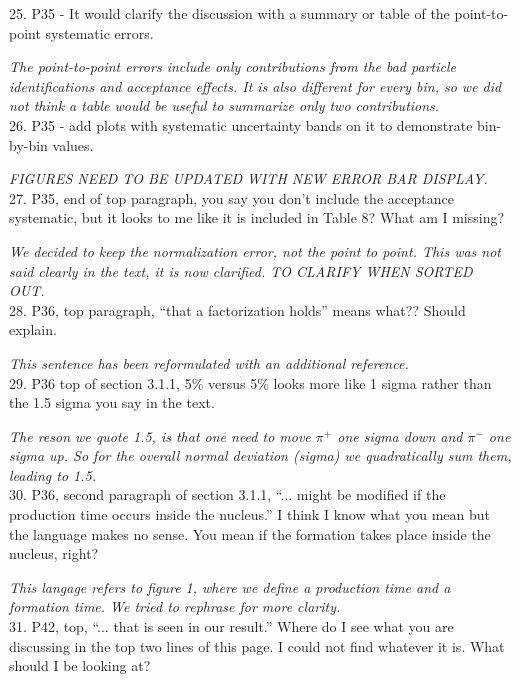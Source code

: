 \documentclass[12pt]{article}
\begin{document}
25.
P35 - It would clarify the discussion with a summary or table of the point-to-point systematic 
errors.

{\it The point-to-point errors include only contributions from the bad particle 
identifications and acceptance effects. It is also different for every bin, so
we did not think a table would be useful to summarize only two contributions.} \\

26.
P35 -
 add plots with systematic uncertainty bands on it to demonstrate bin-by-bin values.

{\it FIGURES NEED TO BE UPDATED WITH NEW ERROR BAR DISPLAY.} \\


27.
P35, end of top paragraph, you say you don’t include the acceptance systematic, but it looks 
to me like it is included in Table 8?  What am I missing?

{\it We decided to keep the normalization error, not the point to point. This was not
said clearly in the text, it is now clarified. TO CLARIFY WHEN SORTED OUT.} \\


28.
P36, top paragraph, “that a factorization holds” means what??  Should explain.  

{\it This sentence has been reformulated with an additional reference.} \\


29.
P36 top of section 3.1.1, 5\% versus 5\% looks more like 1 sigma rather than the 1.5 sigma 
you say in the text.

{\it The reson we quote 1.5, is that one need to move $\pi^+$ one sigma down and $\pi^-$ one
sigma up. So for the overall normal deviation (sigma) we quadratically sum them,
leading to 1.5.} \\

30.
P36, second paragraph of section 3.1.1, “... might be modified if the production time occurs 
inside the nucleus.”  I think I know what you mean but the language makes no sense.  You 
mean if the formation takes place inside the nucleus, right?

{\it This langage refers to figure 1, where we define a production time and a 
formation time. We tried to rephrase for more clarity.}\\

31.
P42, top, “... that is seen in our result.”  Where do I see what you are discussing in the top 
two lines of this page.  I could not find whatever it is.  What should I be looking at?
\end{document}
